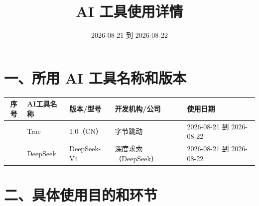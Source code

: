 \documentclass[12pt,a4paper]{ctexart}
\title{AI 工具使用详情}
\author{}
\date{2026-08-21 到 2026-08-22}
\begin{document}
\maketitle

\section*{一、所用 AI 工具名称和版本}

\begin{longtable}{|c|l|l|l|l|}
\hline
序号 & AI工具名称 & 版本/型号 & 开发机构/公司 & 使用日期 \\
\hline
[AI-1-1] & Trae & 1.0（CN） & 字节跳动 & 2026-08-21 到 2026-08-22 \\
\hline
[AI-1-2] & DeepSeek & DeepSeek-V4 & 深度求索（DeepSeek） & 2026-08-21 到 2026-08-22 \\
\hline
\end{longtable}

\section*{二、具体使用目的和环节}
\end{document}
